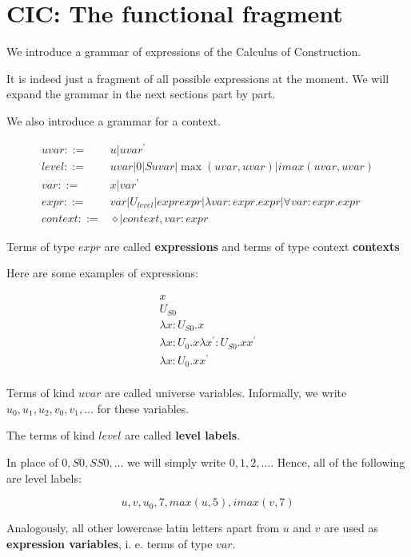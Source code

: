 \section{CIC: The functional fragment}
\vspace{10.5cm}

We introduce a grammar of expressions of the Calculus of Construction.

It is indeed just a fragment of all possible expressions at the moment. We will expand the grammar in the next
sections part by part.

We also introduce a grammar for a context.

\begin{align*}
	uvar    {}::={} & u \vert uvar^\prime\\
	level   {}::={} & uvar \vert 0 \vert S uvar \vert \max(uvar, uvar) \vert imax(uvar, uvar)\\
	var     {}::={} & x \vert var^\prime\\
	expr    {}::={} &  var \vert U_{level} \vert expr expr \vert \lambda var:expr.expr \vert \forall var:expr.expr \\
	context {}::={} &  \diamond\vert context, var: expr 
\end{align*}

Terms of type $expr$ are called \textbf{expressions} and terms of type context \textbf{contexts}

Here are some examples of expressions:

\begin{align*}
	x\\
	U_{S0}\\
	\lambda x:U_{S0}.x\\
	\lambda x:U_{0}.x\lambda x^\prime:U_{S0}.x x^\prime\\
	\lambda x:U_{0}.x x^\prime\\
\end{align*}

Terms of kind $uvar$ are called universe variables. Informally, we write $u_0, u_1, u_2, v_0, v_1, \dots$ for these
variables.

The terms of kind $level$ are called \textbf{level labels}.

In place of $0, S0, SS0,\dots$ we will simply write $0, 1, 2,\dots$. Hence, all of the following are level labels:

$$u, v, u_0, 7, max(u, 5), imax(v, 7)$$

Analogously, all other lowercase latin letters apart from $u$ and $v$ are used as \textbf{expression variables}, i. e.
terms of type $var$.

